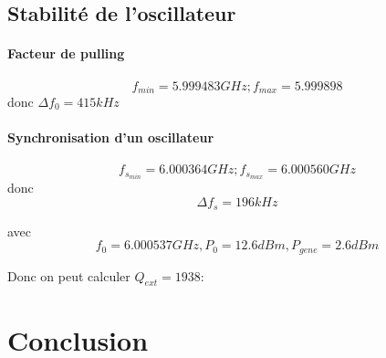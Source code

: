 \documentclass[oneside,a4paper,12pt]{article}
\begin{document}
	\subsection{Stabilité de l'oscillateur}

	\paragraph*{Facteur de pulling} \paragraph{}

	\[ f_{min} = 5.999483 GHz; f_{max} = 5.999898 \]
	donc $ \Delta f_{0} = 415 kHz $

	\paragraph*{Synchronisation d'un oscillateur}\paragraph*{}

	\[ f_{s_{min}} = 6.000364 GHz; f_{s_{max}} = 6.000560 GHz \]
	donc 
	\[ \Delta f_{s} = 196 kHz \]

	avec 
	\[ f_{0} = 6.000537 GHz, P_{0} = 12.6 dBm, P_{gene} = 2.6 dBm \]

	Donc on peut calculer $ Q_{ext} = 1938 $:


	\newpage
	\section{Conclusion}
			
\end{document}
